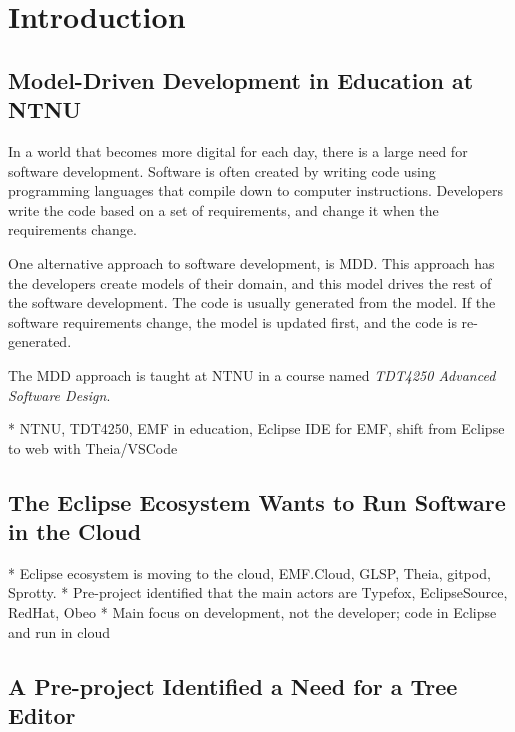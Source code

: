\chapter{Introduction}\label{chap:introduction}

\section{Model-Driven Development in Education at NTNU}

In a world that becomes more digital for each day, there is a large need for software development. Software is often created by writing code using programming languages that compile down to computer instructions. Developers write the code based on a set of requirements, and change it when the  requirements change.

One alternative approach to software development, is \acrfull{MDD}.
This approach has the developers create models of their \gls{domain}, and this model drives the rest of the software development. The code is usually generated from the model. If the software requirements change, the model is updated first, and the code is re-generated.

The \acrshort{MDD} approach is taught at \acrfull{NTNU} in a course named \textit{\gls{TDT4250} Advanced Software Design}.

* NTNU, TDT4250, EMF in education, Eclipse IDE for EMF, shift from Eclipse to web with Theia/VSCode

\section{The Eclipse Ecosystem Wants to Run Software in the Cloud}

* Eclipse ecosystem is moving to the cloud, EMF.Cloud, GLSP, Theia, gitpod, Sprotty.
  * Pre-project identified that the main actors are Typefox, EclipseSource, RedHat, Obeo
  * Main focus on development, not the developer; code in Eclipse and run in cloud

\section{A Pre-project Identified a Need for a Tree Editor}

